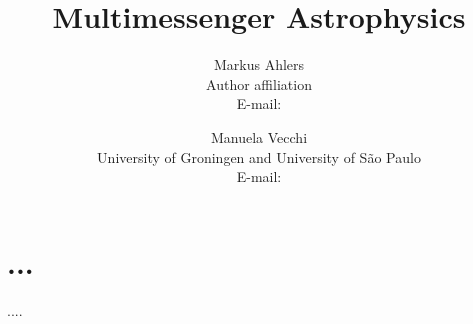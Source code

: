 \documentclass{PoS}
\title{Multimessenger Astrophysics}
\author{Markus Ahlers\\
        Author affiliation\\
        E-mail: \email{author@email}}
\author{Manuela Vecchi\\
       University of Groningen and University of S\~ao Paulo\\
        E-mail: \email{m.vecchi@rug.nl}}
\begin{document}
\section{...}

\begin{thebibliography}{99}
....

\end{thebibliography}
\end{document}
